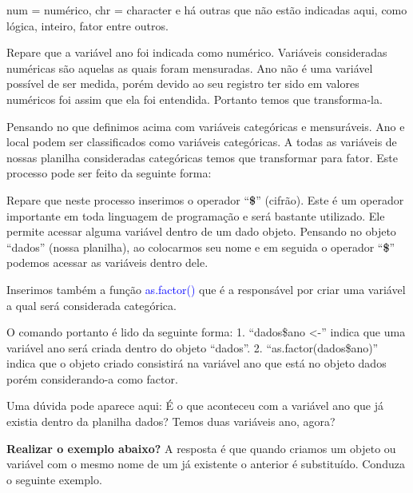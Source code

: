 \documentclass[titlepage, oneside, openany, a4paper]{book}
\newenvironment{Shaded}{\begin{snugshade}}{\end{snugshade}}
\newcommand{\KeywordTok}[1]{\textcolor[rgb]{0.13,0.29,0.53}{\textbf{#1}}}
\newcommand{\NormalTok}[1]{#1}
\newcommand{\OperatorTok}[1]{\textcolor[rgb]{0.81,0.36,0.00}{\textbf{#1}}}
\newcommand{\StringTok}[1]{\textcolor[rgb]{0.31,0.60,0.02}{#1}}
\begin{document}
num = numérico, chr = character e há outras que não estão indicadas aqui, como lógica, inteiro, fator entre outros.

Repare que a variável ano foi indicada como numérico. Variáveis consideradas numéricas são aquelas as quais foram mensuradas. Ano não é uma variável possível de ser medida, porém devido ao seu registro ter sido em valores numéricos foi assim que ela foi entendida. Portanto temos que transforma-la.

Pensando no que definimos acima com variáveis categóricas e mensuráveis. Ano e local podem ser classificados como variáveis categóricas. A todas as variáveis de nossas planilha consideradas categóricas temos que transformar para fator. Este processo pode ser feito da seguinte forma:

\begin{Shaded}
\end{Shaded}

Repare que neste processo inserimos o operador ``\textbf{\$}'' (cifrão). Este é um operador importante em toda linguagem de programação e será bastante utilizado. Ele permite acessar alguma variável dentro de um dado objeto. Pensando no objeto ``dados'' (nossa planilha), ao colocarmos seu nome e em seguida o operador ``\textbf{\$}'' podemos acessar as variáveis dentro dele.

Inserimos também a função \textcolor{blue}{as.factor()} que é a responsável por criar uma variável a qual será considerada categórica.

O comando portanto é lido da seguinte forma:
1. ``dados\$ano \textless{}-'' indica que uma variável ano será criada dentro do objeto ``dados''.
2. ``as.factor(dados\$ano)'' indica que o objeto criado consistirá na variável ano que está no objeto dados porém considerando-a como factor.

Uma dúvida pode aparece aqui: É o que aconteceu com a variável ano que já existia dentro da planilha dados? Temos duas variáveis ano, agora?

\textbf{Realizar o exemplo abaixo?}
A resposta é que quando criamos um objeto ou variável com o mesmo nome de um já existente o anterior é substituído. Conduza o seguinte exemplo.
\end{document}
